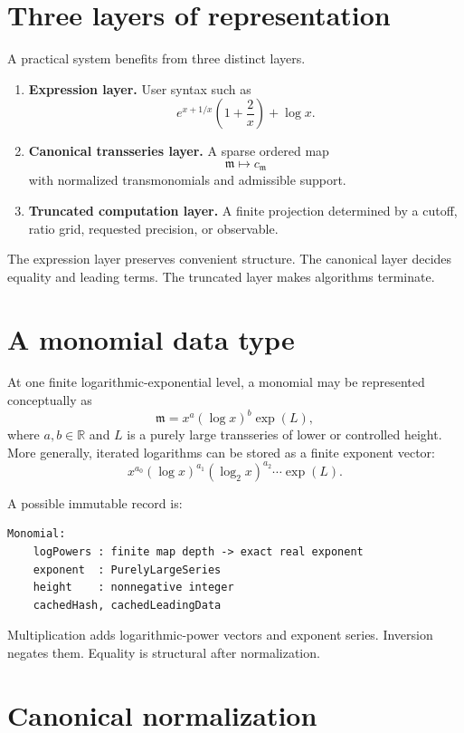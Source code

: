 \documentclass[11pt,openany]{book}
\theoremstyle{definition}
\theoremstyle{plain}
\theoremstyle{remark}
\newcommand{\R}{\mathbb{R}}
\newcommand{\m}{\mathfrak{m}}
\begin{document}
\section{Three layers of representation}

A practical system benefits from three distinct layers.

\begin{enumerate}
 \item \textbf{Expression layer.} User syntax such as
 \[
  e^{x+1/x}\left(1+\frac2x\right)+\log x.
 \]
 \item \textbf{Canonical transseries layer.} A sparse ordered map
 \[
  \m\longmapsto c_\m
 \]
 with normalized transmonomials and admissible support.
 \item \textbf{Truncated computation layer.} A finite projection determined by a cutoff, ratio grid, requested precision, or observable.
\end{enumerate}

The expression layer preserves convenient structure. The canonical layer decides equality and leading terms. The truncated layer makes algorithms terminate.

\section{A monomial data type}

At one finite logarithmic-exponential level, a monomial may be represented conceptually as
\begin{equation}\label{eq:monomial-record}
 \m=x^a(\log x)^b\exp(L),
\end{equation}
where $a,b\in\R$ and $L$ is a purely large transseries of lower or controlled height. More generally, iterated logarithms can be stored as a finite exponent vector:
\[
 x^{a_0}(\log x)^{a_1}(\log_2x)^{a_2}\cdots
 \exp(L).
\]

A possible immutable record is:

\begin{lstlisting}[style=pseudo]
Monomial:
    logPowers : finite map depth -> exact real exponent
    exponent  : PurelyLargeSeries
    height    : nonnegative integer
    cachedHash, cachedLeadingData
\end{lstlisting}

Multiplication adds logarithmic-power vectors and exponent series. Inversion negates them. Equality is structural after normalization.

\section{Canonical normalization}
\end{document}
